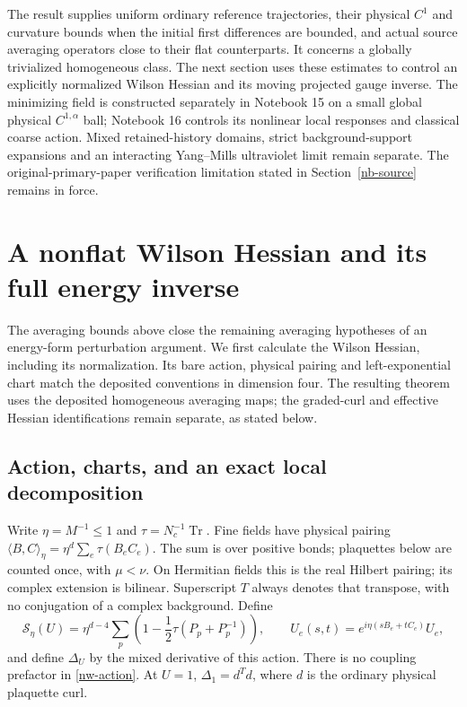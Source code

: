 \documentclass[11pt]{article}
\theoremstyle{remark}
\newcommand{\norm}[1]{\left\|#1\right\|}
\begin{document}
The result supplies uniform ordinary reference trajectories,
their physical $C^1$ and curvature bounds when the initial
first differences are bounded, and actual source averaging
operators close to their flat counterparts. It concerns a
globally trivialized homogeneous class. The next section uses these estimates to control an explicitly
normalized Wilson Hessian and its moving projected gauge inverse.
The minimizing field is constructed separately in Notebook 15
on a small global physical $C^{1,\alpha}$ ball; Notebook 16
controls its nonlinear local responses and classical coarse action.
Mixed retained-history domains, strict background-support expansions
and an interacting Yang--Mills ultraviolet limit remain separate.
The original-primary-paper
verification limitation stated in Section~\ref{nb-source}
remains in force.


\section{A nonflat Wilson Hessian and its full energy inverse}
\label{nw-section}

The averaging bounds above close the remaining averaging hypotheses
of an energy-form perturbation argument. We first calculate the
Wilson Hessian, including its normalization. Its bare action,
physical pairing and left-exponential chart match the deposited
conventions in dimension four. The resulting theorem uses the
deposited homogeneous averaging maps; the graded-curl and effective
Hessian identifications remain separate, as stated below.

\subsection{Action, charts, and an exact local decomposition}
\label{nw-wilson}

Write $\eta=M^{-1}\le1$ and $\tau=N_c^{-1}\operatorname{Tr}$.
Fine fields have physical pairing
$\langle B,C\rangle_\eta=\eta^d\sum_e\tau(B_eC_e)$.
The sum is over positive bonds; plaquettes below are counted once,
with $\mu<\nu$. On Hermitian fields this is the real Hilbert pairing;
its complex extension is bilinear. Superscript $T$ always denotes
that transpose, with no conjugation of a complex background.
Define
\begin{equation}\label{nw-action}
 \mathcal S_\eta(U)=\eta^{d-4}\sum_p
   \left(1-\frac12\tau(P_p+P_p^{-1})\right),\qquad
 U_e(s,t)=e^{i\eta(sB_e+tC_e)}U_e,
\end{equation}
and define $\Delta_U$ by the mixed derivative of this action.
There is no coupling prefactor in \eqref{nw-action}. At $U=1$,
$\Delta_1=d^Td$, where $d$ is the ordinary physical plaquette curl.
\end{document}

